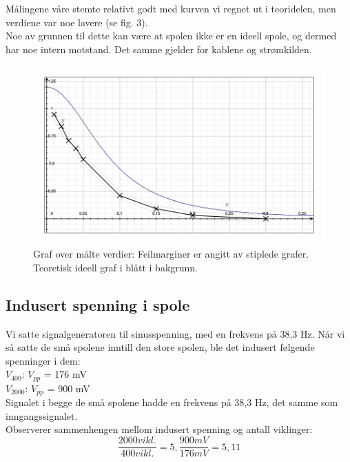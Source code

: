 \documentclass[12pt,norsk,a4paper]{article}
\begin{document}
Målingene våre stemte relativt godt med kurven vi regnet ut i teoridelen, men verdiene var noe lavere (se fig. 3). \\ 
Noe av grunnen til dette kan være at spolen ikke er en ideell spole, og dermed har noe intern motstand. Det samme gjelder for kablene og strømkilden.


\begin{figure}[H]
\includegraphics[scale=0.4]{maalinger.jpg}
\caption{Graf over målte verdier: Feilmarginer er angitt av stiplede grafer. Teoretisk ideell graf i blått i bakgrunn. }
\end{figure}

\clearpage


\subsection{Indusert spenning i spole}
Vi satte signalgeneratoren til sinusspenning, med en frekvens på 38,3 Hz.
Når vi så satte de små spolene inntill den store spolen, ble det indusert følgende spenninger i dem:\\

$V_{400}$: $V_{pp}$ = 176 mV\\

$V_{2000}$: $V_{pp}$ = 900 mV\\

Signalet i begge de små spolene hadde en frekvens på 38,3 Hz, det samme som inngangssignalet.\\

Observerer sammenhengen mellom indusert spenning og antall viklinger:\\

\begin{equation}
    \label{eq:viklinker1}
    \frac{2000 vikl. }{400 vikl. } = 5 , \frac{900 mV}{176 mV} = 5,11
\end{equation}\\
\end{document}

